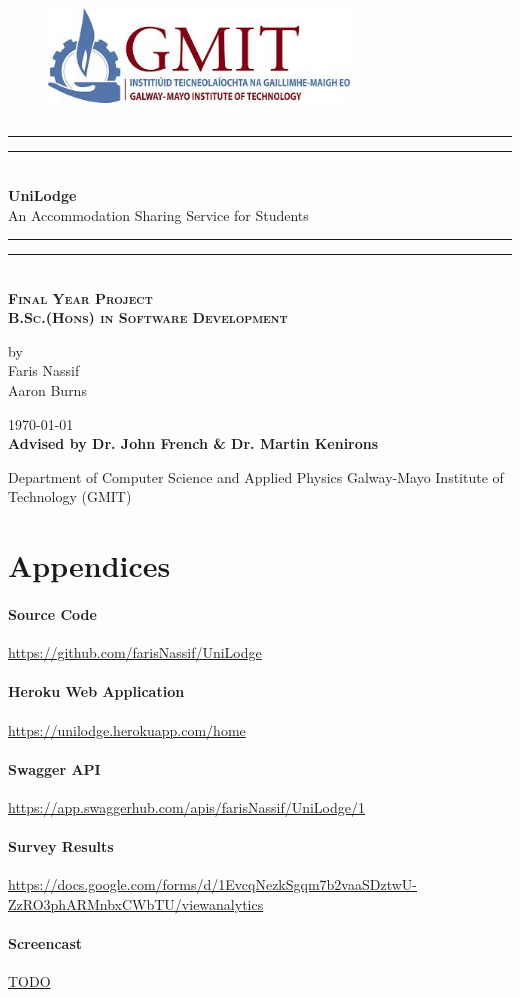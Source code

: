 \documentclass[10pt]{report}
\newcommand*{\customTitle}{\begingroup %
\centering %
\vspace*{\baselineskip} %

\rule{\textwidth}{1.6pt}\vspace*{-\baselineskip}\vspace*{2pt} %
\rule{\textwidth}{0.4pt}\\[\baselineskip] %

{\Large \textbf{UniLodge}  \\[2ex] An Accommodation Sharing Service for Students}\\[0.2\baselineskip] %


\rule{\textwidth}{0.4pt}\vspace*{-\baselineskip}\vspace{3.2pt} %
\rule{\textwidth}{1.6pt}\\[\baselineskip] %
\scshape %
\Large \textbf{Final Year Project}\\
\textbf{B.Sc.(Hons) in Software Development}\par %
\normalsize
\vspace*{2\baselineskip} %


{by \\ Faris Nassif \\ Aaron Burns \par} %


\vspace*{2\baselineskip} %
\vfill %
{\scshape \today} \\[0.3\baselineskip] %


{\textbf{Advised by Dr. John French \& Dr. Martin Kenirons}}\par %

{Department of Computer Science and Applied Physics Galway-Mayo Institute of Technology (GMIT)}\par %


\endgroup}
\begin{document}
 
\begin{figure}
\begin{center}
\includegraphics[width=8cm,height=3.3cm,keepaspectratio]{images/gmit-logo.jpg} %
\end{center}
\end{figure}
\customTitle %
\tableofcontents
\listoffigures
{} 














\appendix
\chapter*{Appendices}
\renewcommand{\thesection}{A.\arabic{section}}

\subsubsection{Source Code}
\url{https://github.com/farisNassif/UniLodge}

\subsubsection{Heroku Web Application}
\url{https://unilodge.herokuapp.com/home}

\subsubsection{Swagger API}
\url{https://app.swaggerhub.com/apis/farisNassif/UniLodge/1}

\subsubsection{Survey Results}
\url{https://docs.google.com/forms/d/1EvcqNezkSgqm7b2vaaSDztwU-ZzRO3phARMnbxCWbTU/viewanalytics}

\subsubsection{Screencast}
\url{TODO}
\end{document}
